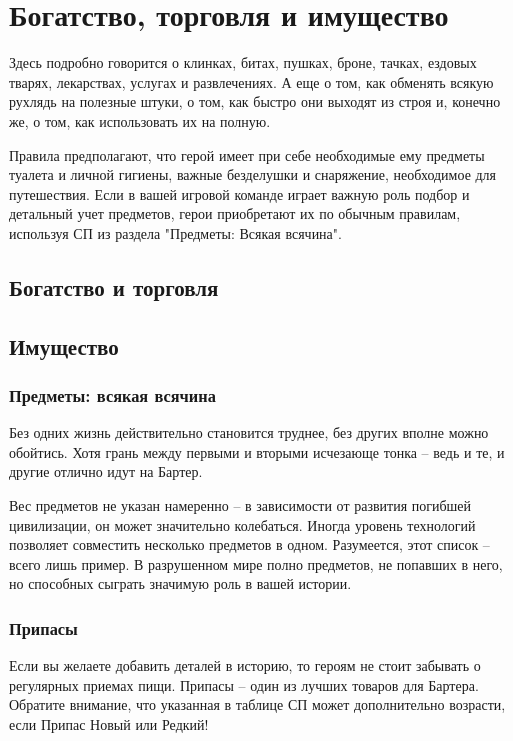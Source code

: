 \chapter{Богатство, торговля и имущество}
Здесь подробно говорится о клинках, битах, пушках, броне, тачках, ездовых тварях, лекарствах, услугах и развлечениях. А еще о том, как обменять всякую рухлядь на полезные штуки, о том, как быстро они выходят из строя и, конечно же, о том, как использовать их на полную.
\begin{tcolorbox}
    Правила предполагают, что герой имеет при себе необходимые ему предметы туалета и личной гигиены, важные безделушки и снаряжение, необходимое для путешествия. Если в вашей игровой команде играет важную роль подбор и детальный учет предметов, герои приобретают их по обычным правилам, используя СП из раздела "Предметы: Всякая всячина".
\end{tcolorbox}

\section{Богатство и торговля}

\section{Имущество}






\subsection{Предметы: всякая всячина}
Без одних жизнь действительно становится труднее, без других вполне можно обойтись. Хотя грань между первыми и вторыми исчезающе тонка – ведь и те, и другие отлично идут на Бартер.
\begin{tcolorbox}
    Вес предметов не указан намеренно – в зависимости от развития погибшей цивилизации, он может значительно колебаться. Иногда уровень технологий позволяет совместить несколько предметов в одном.
    \newline Разумеется, этот список – всего лишь пример. В разрушенном мире полно предметов, не попавших в него, но способных сыграть значимую роль в вашей истории.
\end{tcolorbox}

\subsection{Припасы}
Если вы желаете добавить деталей в историю, то героям не стоит забывать о регулярных приемах пищи.
Припасы – один из лучших товаров для Бартера. Обратите внимание, что указанная в таблице СП может дополнительно возрасти, если Припас Новый или Редкий!
